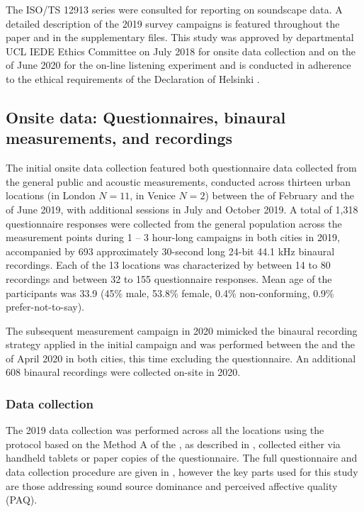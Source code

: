 The ISO/TS 12913 \citep{international_organisation_for_standardization_isots_2018} series were consulted for reporting on soundscape data. A detailed description of the 2019 survey campaigns is featured throughout the paper and in the supplementary files. This study was approved by departmental UCL IEDE Ethics Committee on  July 2018 for onsite data collection and on the  of June 2020 for the on-line listening experiment and is conducted in adherence to the ethical requirements of the Declaration of Helsinki \citep{WMA_Helsinki_2013}.

\subsection{Onsite data: Questionnaires, binaural measurements, and recordings}
The initial onsite data collection featured both questionnaire data collected from the general public and acoustic measurements, conducted across thirteen urban locations (in London $N=11$, in Venice $N=2$) between the  of February and the  of June 2019, with additional sessions in July and October 2019. A total of 1,318 questionnaire responses were collected from the general population across the measurement points during 1 – 3 hour-long campaigns in both cities in 2019, accompanied by 693 approximately 30-second long 24-bit 44.1 kHz binaural recordings. Each of the 13 locations was characterized by between 14 to 80 recordings and between 32 to 155 questionnaire responses. Mean age of the participants was 33.9 (45\% male, 53.8\% female, 0.4\% non-conforming, 0.9\% prefer-not-to-say).

The subsequent measurement campaign in 2020 mimicked the binaural recording strategy applied in the initial campaign and was performed between the  and the  of April 2020 in both cities, this time excluding the questionnaire. An additional 608 binaural recordings were collected on-site in 2020. 

\subsubsection{Data collection}
The 2019 data collection was performed across all the locations using the protocol based on the Method A of the \citet{international_organisation_for_standardization_isots_2018}, as described in \citep{aletta_assessing_2020, mitchell_soundscape_2020}, collected either via handheld tablets or paper copies of the questionnaire. The full questionnaire and data collection procedure are given in \citet{mitchell_soundscape_2020}, however the key parts used for this study are those addressing sound source dominance and perceived affective quality (PAQ). 

